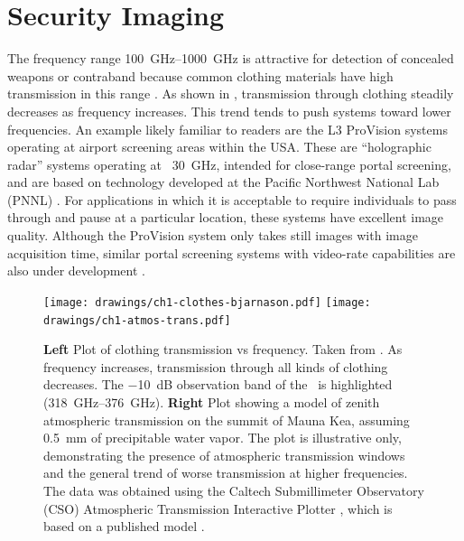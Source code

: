 \section{Security Imaging}

The frequency range \SIrange{100}{1000}{\GHz} is attractive for detection of concealed weapons or contraband because common clothing materials have high transmission in this range \cite{bjarnason_millimeter-wave_2004}.
As shown in , transmission through clothing steadily decreases as frequency increases.
This trend tends to push systems toward lower frequencies.
An example likely familiar to readers are the L3 ProVision systems operating at airport screening areas within the USA.
These are ``holographic radar'' systems operating at ~\SI{30}{\GHz}, intended for close-range portal screening, and are based on technology developed at the Pacific Northwest National Lab (PNNL) \cite{sheen_cylindrical_1998,mcmakin_dual-surface_2009}.
For applications in which it is acceptable to require individuals to pass through and pause at a particular location, these systems have excellent image quality.
Although the ProVision system only takes still images with  image acquisition time, similar portal screening systems with video-rate capabilities are also under development \cite{lyons_reflect-array_2013}.

\begin{figure}
\centering
\texttt{[image: drawings/ch1-clothes-bjarnason.pdf]}
\texttt{[image: drawings/ch1-atmos-trans.pdf]}
\caption[Clothing and Atmospheric Transmission vs Frequency]{
  \textbf{Left}
  Plot of clothing transmission vs frequency.
  Taken from \cite{bjarnason_millimeter-wave_2004}.
  As frequency increases, transmission through all kinds of clothing decreases.
  The \SI{-10}{\dB} observation band of the \Imager\ is highlighted (\SIrange{318}{376}{\GHz}).
  \textbf{Right}
  Plot showing a model of zenith atmospheric transmission on the summit of Mauna Kea, assuming \SI{0.5}{\mm} of precipitable water vapor.
  The plot is illustrative only, demonstrating the presence of atmospheric transmission windows and the general trend of worse transmission at higher frequencies.
  The data was obtained using the Caltech Submillimeter Observatory (CSO) Atmospheric Transmission Interactive Plotter \cite{darek_lis_cso_????}, which is based on a published model \cite{pardo_atmospheric_2001}.
}
\label{fig:ch1-clothes-atmos-trans}
\end{figure}

